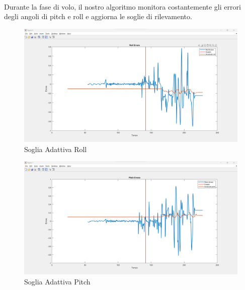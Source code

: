 \\
Durante la fase di volo, il nostro algoritmo monitora costantemente gli errori degli angoli di pitch e roll e aggiorna le soglie di rilevamento.
\\
\begin{figure}[H]
      \centering
      \includegraphics[width=\linewidth]{files/images/soglia_adattiva_roll.png} %
      \caption{Soglia Adattiva Roll} %
      \label{fig:Soglia adattiva Roll} %
\end{figure}%
\begin{figure}[H] %
        \centering
        \includegraphics[width=\linewidth]{files/images/soglia_adattiva_pitch.png} %
        \caption{Soglia Adattiva Pitch} %
      \label{fig:Soglia Adattiva Pitch} %
\end{figure}
